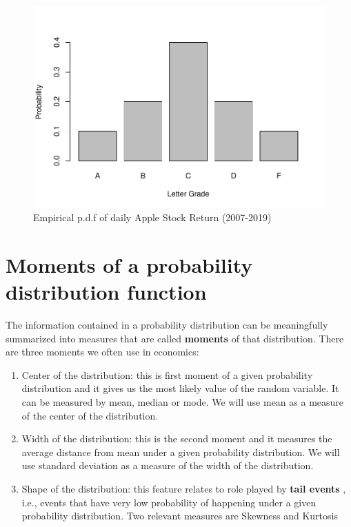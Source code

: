 \documentclass[]{book}
\theoremstyle{definition}
\theoremstyle{definition}
\theoremstyle{definition}
\theoremstyle{remark}
\begin{document}
\begin{figure}
\centering
\includegraphics{bookdown-demo_files/figure-latex/unnamed-chunk-42-1.pdf}
\caption{\label{fig:unnamed-chunk-42}Empirical p.d.f of daily Apple Stock Return (2007-2019)}
\end{figure}

\hypertarget{moments-of-a-probability-distribution-function}{%
\section{Moments of a probability distribution function}\label{moments-of-a-probability-distribution-function}}

The information contained in a probability distribution can be meaningfully summarized into measures that are called \textbf{moments} of that distribution. There are three moments we often use in economics:

\begin{enumerate}
\def\labelenumi{\arabic{enumi}.}
\item
  Center of the distribution: this is first moment of a given probability distribution and it gives us the most likely value of the random variable. It can be measured by mean, median or mode. We will use mean as a measure of the center of the distribution.
\item
  Width of the distribution: this is the second moment and it measures the average distance from mean under a given probability distribution. We will use standard deviation as a measure of the width of the distribution.
\item
  Shape of the distribution: this feature relates to role played by \textbf{tail events} , i.e., events that have very low probability of happening under a given probability distribution. Two relevant measures are Skewness and Kurtosis
\end{enumerate}
\end{document}
